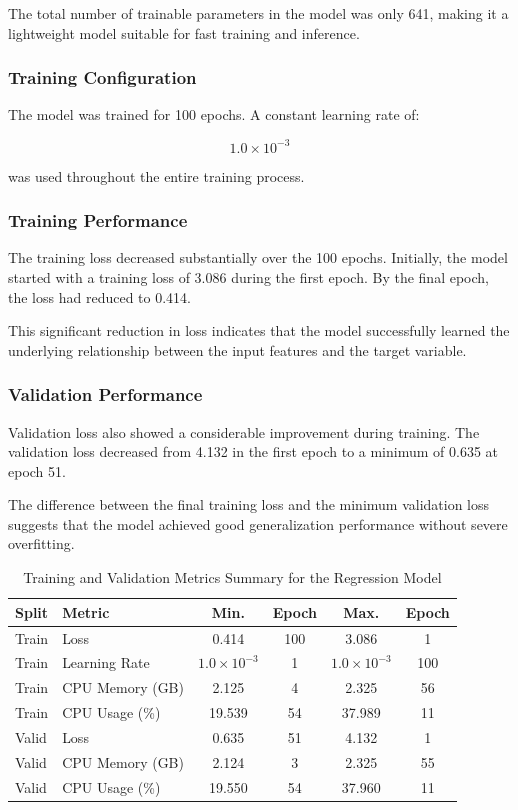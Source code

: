 \documentclass[10pt,a4paper,twocolumn]{article}
\begin{document}
The total number of trainable parameters in the model was only 641, making it a lightweight model suitable for fast training and inference.

\subsubsection{Training Configuration}

The model was trained for 100 epochs. A constant learning rate of:

\[
1.0 \times 10^{-3}
\]

was used throughout the entire training process.

\subsubsection{Training Performance}

The training loss decreased substantially over the 100 epochs. Initially, the model started with a training loss of 3.086 during the first epoch. By the final epoch, the loss had reduced to 0.414.

This significant reduction in loss indicates that the model successfully learned the underlying relationship between the input features and the target variable.

\subsubsection{Validation Performance}

Validation loss also showed a considerable improvement during training. The validation loss decreased from 4.132 in the first epoch to a minimum of 0.635 at epoch 51.

The difference between the final training loss and the minimum validation loss suggests that the model achieved good generalization performance without severe overfitting.

\begin{table}[t!]
\centering
\caption{Training and Validation Metrics Summary for the Regression Model}
\begin{tabular}{|l|l|c|c|c|c|}
\hline
\textbf{Split} & \textbf{Metric} & \textbf{Min.} & \textbf{Epoch} & \textbf{Max.} & \textbf{Epoch} \\
\hline
Train & Loss & 0.414 & 100 & 3.086 & 1 \\
Train & Learning Rate & $1.0 \times 10^{-3}$ & 1 & $1.0 \times 10^{-3}$ & 100 \\
Train & CPU Memory (GB) & 2.125 & 4 & 2.325 & 56 \\
Train & CPU Usage (\%) & 19.539 & 54 & 37.989 & 11 \\
\hline
Valid & Loss & 0.635 & 51 & 4.132 & 1 \\
Valid & CPU Memory (GB) & 2.124 & 3 & 2.325 & 55 \\
Valid & CPU Usage (\%) & 19.550 & 54 & 37.960 & 11 \\
\hline
\end{tabular}
\label{tab:regression_metrics_summary}
\end{table}
\end{document}
